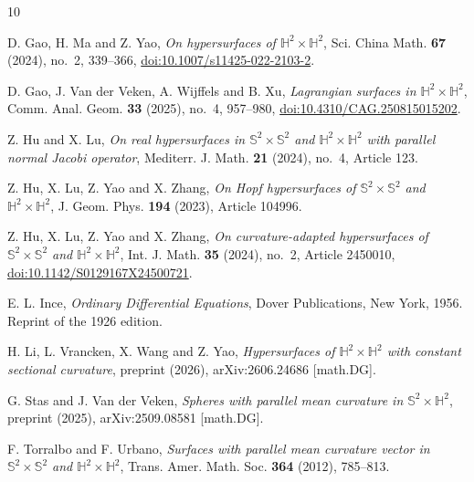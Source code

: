 \documentclass[11pt,a4paper]{amsart}
\theoremstyle{plain}
\theoremstyle{remark}
\newcommand{\Hyp}{\mathbb{H}}
\begin{document}
\begin{thebibliography}{10}

D. Gao, H. Ma and Z. Yao,
\emph{On hypersurfaces of $\Hyp^2 \times \Hyp^2$},
Sci. China Math. \textbf{67} (2024), no.~2, 339--366,
\href{https://doi.org/10.1007/s11425-022-2103-2}{doi:10.1007/s11425-022-2103-2}.

D. Gao, J. Van der Veken, A. Wijffels and B. Xu,
\emph{Lagrangian surfaces in $\Hyp^2\times\Hyp^2$},
Comm. Anal. Geom. \textbf{33} (2025), no.~4, 957--980,
\href{https://doi.org/10.4310/CAG.250815015202}{doi:10.4310/CAG.250815015202}.

Z. Hu and X. Lu,
\emph{On real hypersurfaces in
$\mathbb{S}^2\times \mathbb{S}^2$ and $\Hyp^2\times\Hyp^2$
with parallel normal Jacobi operator},
Mediterr. J. Math. \textbf{21} (2024), no.~4, Article 123.

Z. Hu, X. Lu, Z. Yao and X. Zhang,
\emph{On Hopf hypersurfaces of
$\mathbb{S}^2\times \mathbb{S}^2$ and $\Hyp^2\times\Hyp^2$},
J. Geom. Phys. \textbf{194} (2023), Article 104996.

Z. Hu, X. Lu, Z. Yao and X. Zhang,
\emph{On curvature-adapted hypersurfaces of
$\mathbb{S}^2\times \mathbb{S}^2$ and $\Hyp^2\times\Hyp^2$},
Int. J. Math. \textbf{35} (2024), no.~2, Article 2450010,
\href{https://doi.org/10.1142/S0129167X24500721}
{doi:10.1142/S0129167X24500721}.

 E. L. Ince, \emph{Ordinary Differential Equations}, Dover Publications, New York, 1956. Reprint of the 1926 edition.

H. Li, L. Vrancken, X. Wang and Z. Yao,
\emph{Hypersurfaces of $\Hyp^2\times\Hyp^2$ with constant
sectional curvature},
preprint (2026),
arXiv:2606.24686 [math.DG].

G. Stas and J. Van der Veken,
\emph{Spheres with parallel mean curvature in
$\mathbb{S}^2 \times \mathbb{H}^2$},
preprint (2025),
arXiv:2509.08581 [math.DG].

F. Torralbo and F. Urbano,
\emph{Surfaces with parallel mean curvature vector in
$\mathbb{S}^2\times\mathbb{S}^2$ and $\Hyp^2\times\Hyp^2$},
Trans. Amer. Math. Soc. \textbf{364} (2012), 785--813.


\end{thebibliography}
 
\end{document}
